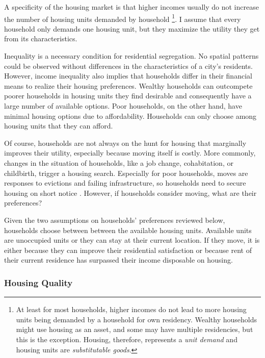 \documentclass[a4paper,12pt]{article}
\begin{document}
A specificity of the housing market is that higher incomes usually do not increase the number of housing units demanded by household \citep[353]{glaeserUrbanDeclineDurable2005}\footnote{At least for most households, higher incomes do not lead to more housing units being demanded by a household for own residency. Wealthy households might use housing as an asset, and some may have multiple residencies, but this is the exception. Housing, therefore, represents a \textit{unit demand} and housing units are \textit{substitutable goods}.}. I assume that every household only demands one housing unit, but they maximize the utility they get from its characteristics.

Inequality is a necessary condition for residential segregation. No spatial patterns could be observed without differences in the characteristics of a city's residents. However, income inequality also implies that households differ in their financial means to realize their housing preferences. Wealthy households can outcompete poorer households in housing units they find desirable and consequently have a large number of available options. Poor households, on the other hand, have minimal housing options due to affordability. Households can only choose among housing units that they can afford.

Of course, households are not always on the hunt for housing that marginally improves their utility, especially because moving itself is costly. More commonly, changes in the situation of households, like a job change, cohabitation, or childbirth, trigger a housing search. Especially for poor households, moves are responses to evictions and failing infrastructure, so households need to secure housing on short notice \citep{delucaNotJustLateral2020}. However, if households consider moving, what are their preferences? 

Given the two assumptions on households' preferences reviewed below, households choose between between the available housing units. Available units are unoccupied units or they can stay at their current location. If they move, it is either because they can improve their residential satisfaction or because rent of their current residence has surpassed their income disposable on housing. 

\subsubsection{Housing Quality}
\end{document}
